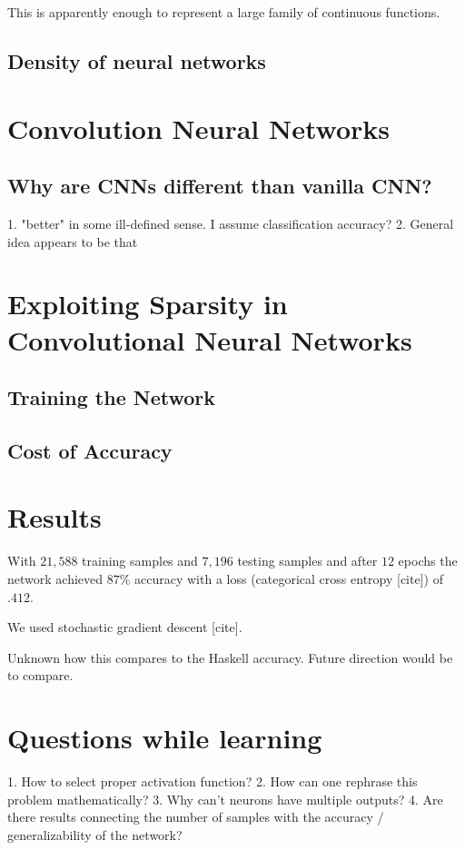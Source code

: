 \documentclass[12pt,letterpaper,boxed]{article}
\begin{document}
		This is apparently enough to represent a large family of continuous functions.

	\subsection{Density of neural networks}

\section{Convolution Neural Networks}

\subsection{Why are CNNs different than vanilla CNN?}
1. "better" in some ill-defined sense. I assume classification accuracy?
2. General idea appears to be that

\section{Exploiting Sparsity in Convolutional Neural Networks}

	\subsection{Training the Network}

	\subsection{Cost of Accuracy}

\section{Results}
With $21,588$ training samples and $7,196$ testing samples and after $12$ epochs the network achieved $87\%$ accuracy with a loss (categorical cross entropy [cite]) of $.412$.

We used stochastic gradient descent [cite].

Unknown how this compares to the Haskell accuracy. Future direction would be to compare.




\section{Questions while learning}
1. How to select proper activation function?
2. How can one rephrase this problem mathematically?
3. Why can't neurons have multiple outputs?
4. Are there results connecting the number of samples with the accuracy / generalizability of the network?
\end{document}
